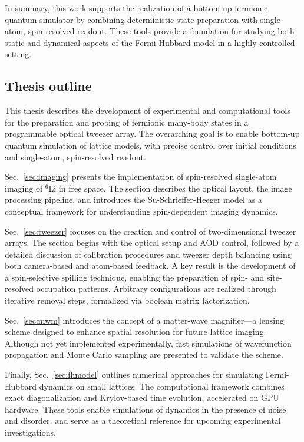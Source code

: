 In summary, this work supports the realization of a bottom-up fermionic quantum simulator by combining deterministic state preparation with single-atom, spin-resolved readout. These tools provide a foundation for studying both static and dynamical aspects of the Fermi-Hubbard model in a highly controlled setting.


\subsection{Thesis outline}

This thesis describes the development of experimental and computational tools for the preparation and probing of fermionic many-body states in a programmable optical tweezer array. The overarching goal is to enable bottom-up quantum simulation of lattice models, with precise control over initial conditions and single-atom, spin-resolved readout.

Sec.~\ref{sec:imaging} presents the implementation of spin-resolved single-atom imaging of $^6$Li in free space. The section describes the optical layout, the image processing pipeline, and introduces the Su-Schrieffer-Heeger model as a conceptual framework for understanding spin-dependent imaging dynamics.

Sec.~\ref{sec:tweezer} focuses on the creation and control of two-dimensional tweezer arrays. The section begins with the optical setup and AOD control, followed by a detailed discussion of calibration procedures and tweezer depth balancing using both camera-based and atom-based feedback. A key result is the development of a spin-selective spilling technique, enabling the preparation of spin- and site-resolved occupation patterns. Arbitrary configurations are realized through iterative removal steps, formalized via boolean matrix factorization.

Sec.~\ref{sec:mwm} introduces the concept of a matter-wave magnifier—a lensing scheme designed to enhance spatial resolution for future lattice imaging. Although not yet implemented experimentally, fast simulations of wavefunction propagation and Monte Carlo sampling are presented to validate the scheme.

Finally, Sec.~\ref{sec:fhmodel} outlines numerical approaches for simulating Fermi-Hubbard dynamics on small lattices. The computational framework combines exact diagonalization and Krylov-based time evolution, accelerated on GPU hardware. These tools enable simulations of dynamics in the presence of noise and disorder, and serve as a theoretical reference for upcoming experimental investigations.


